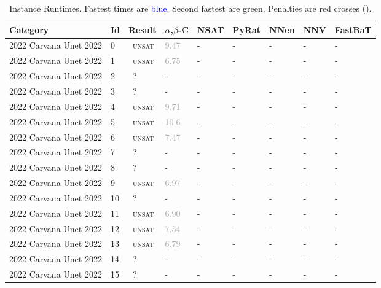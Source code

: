 

\begin{center}
{\setlength{\tabcolsep}{1pt}
\scriptsize
\begin{longtable}{@{}lllllllll@{}}
\caption{\footnotesize Instance Runtimes. Fastest times are \textcolor{blue}{blue}. Second fastest are \textcolor{second}{green}. Penalties are red crosses (\textbf{\textcolor{red}{}}).} \label{tab:all_results} \\
\toprule
\textbf{Category} & \textbf{Id} & \textbf{Result} & \textbf{$\alpha$,$\beta$-C} & \textbf{NSAT} & \textbf{PyRat} & \textbf{NNen} & \textbf{NNV} & \textbf{FastBaT} \\
\midrule
\endhead
2022 Carvana Unet 2022 & 0 & ~\textsc{unsat} & \textcolor{darkgray}{9.47} & - & - & - & - & - \\
2022 Carvana Unet 2022 & 1 & ~\textsc{unsat} & \textcolor{darkgray}{6.75} & - & - & - & - & - \\
2022 Carvana Unet 2022 & 2 & ~? & - & - & - & - & - & - \\
2022 Carvana Unet 2022 & 3 & ~? & - & - & - & - & - & - \\
2022 Carvana Unet 2022 & 4 & ~\textsc{unsat} & \textcolor{darkgray}{9.71} & - & - & - & - & - \\
2022 Carvana Unet 2022 & 5 & ~\textsc{unsat} & \textcolor{darkgray}{10.6} & - & - & - & - & - \\
2022 Carvana Unet 2022 & 6 & ~\textsc{unsat} & \textcolor{darkgray}{7.47} & - & - & - & - & - \\
2022 Carvana Unet 2022 & 7 & ~? & - & - & - & - & - & - \\
2022 Carvana Unet 2022 & 8 & ~? & - & - & - & - & - & - \\
2022 Carvana Unet 2022 & 9 & ~\textsc{unsat} & \textcolor{darkgray}{6.97} & - & - & - & - & - \\
2022 Carvana Unet 2022 & 10 & ~? & - & - & - & - & - & - \\
2022 Carvana Unet 2022 & 11 & ~\textsc{unsat} & \textcolor{darkgray}{6.90} & - & - & - & - & - \\
2022 Carvana Unet 2022 & 12 & ~\textsc{unsat} & \textcolor{darkgray}{7.54} & - & - & - & - & - \\
2022 Carvana Unet 2022 & 13 & ~\textsc{unsat} & \textcolor{darkgray}{6.79} & - & - & - & - & - \\
2022 Carvana Unet 2022 & 14 & ~? & - & - & - & - & - & - \\
2022 Carvana Unet 2022 & 15 & ~? & - & - & - & - & - & - \\

\end{longtable}}
\end{center}
